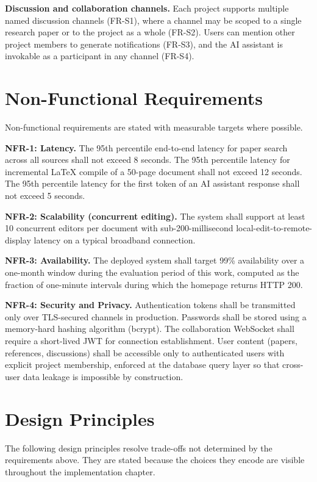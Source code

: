 \textbf{Discussion and collaboration channels.} Each project supports multiple named discussion channels (FR-S1), where a channel may be scoped to a single research paper or to the project as a whole (FR-S2). Users can mention other project members to generate notifications (FR-S3), and the AI assistant is invokable as a participant in any channel (FR-S4).

\section{Non-Functional Requirements}
\label{sec:req-nonfunctional}

Non-functional requirements are stated with measurable targets where possible.

\textbf{NFR-1: Latency.} The 95th percentile end-to-end latency for paper search across all sources shall not exceed 8 seconds. The 95th percentile latency for incremental LaTeX compile of a 50-page document shall not exceed 12 seconds. The 95th percentile latency for the first token of an AI assistant response shall not exceed 5 seconds.

\textbf{NFR-2: Scalability (concurrent editing).} The system shall support at least 10 concurrent editors per document with sub-200-millisecond local-edit-to-remote-display latency on a typical broadband connection.

\textbf{NFR-3: Availability.} The deployed system shall target 99\% availability over a one-month window during the evaluation period of this work, computed as the fraction of one-minute intervals during which the homepage returns HTTP 200.

\textbf{NFR-4: Security and Privacy.} Authentication tokens shall be transmitted only over TLS-secured channels in production. Passwords shall be stored using a memory-hard hashing algorithm (bcrypt). The collaboration WebSocket shall require a short-lived JWT for connection establishment. User content (papers, references, discussions) shall be accessible only to authenticated users with explicit project membership, enforced at the database query layer so that cross-user data leakage is impossible by construction.

\section{Design Principles}
\label{sec:req-principles}

The following design principles resolve trade-offs not determined by the requirements above. They are stated because the choices they encode are visible throughout the implementation chapter.

